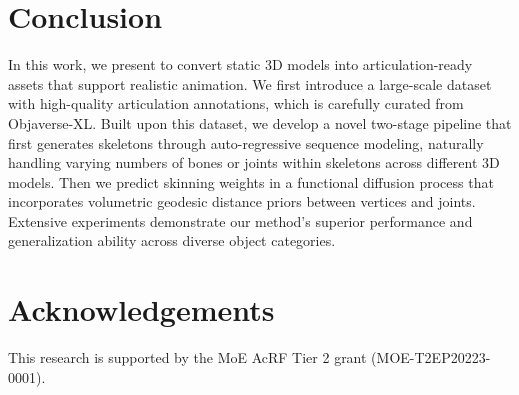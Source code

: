 
\section{Conclusion}

In this work, we present \ours{} to convert static 3D models into articulation-ready assets that support realistic animation. We first introduce a large-scale dataset \ourdata{} with high-quality articulation annotations, which is carefully curated from Objaverse-XL. Built upon this dataset, we develop a novel two-stage pipeline that first generates skeletons through auto-regressive sequence modeling, naturally handling varying numbers of bones or joints within skeletons across different 3D models. Then we predict skinning weights in a functional diffusion process that incorporates volumetric geodesic distance priors between vertices and joints. 
Extensive experiments demonstrate our method's superior performance and generalization ability across diverse object categories.

\section*{Acknowledgements} 
This research is supported by the MoE AcRF Tier 2 grant (MOE-T2EP20223-0001).